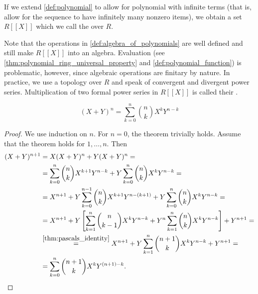 \begin{definition}\label{def:formal_power_series}
  If we extend \cref{def:polynomial} to allow for polynomial with infinite terms (that is, allow for the sequence to have infinitely many nonzero items), we obtain a set \( R[[X]] \) which we call the  over \( R \).

  Note that the operations in \cref{def:algebra_of_polynomials} are well defined and still make \( R[[X]] \) into an algebra. Evaluation (see \cref{thm:polynomial_ring_universal_property} and \cref{def:polynomial_function}) is problematic, however, since algebraic operations are finitary by nature. In practice, we use a topology over \( R \) and speak of convergent and divergent power series. Multiplication of two formal power series in \( R[[X]] \) is called their .
\end{definition}

\begin{theorem}\label{thm:binomial_theorem}
  \begin{equation*}
    (X + Y)^n = \sum_{k=0}^n \binom n k X^k Y^{n-k}
  \end{equation*}
\end{theorem}
\begin{proof}
  We use induction on \( n \). For \( n = 0 \), the theorem trivially holds. Assume that the theorem holds for \( 1, \ldots, n \). Then
  \begin{align*}
    (X + Y)^{n+1}
    &=
    X (X + Y)^n + Y (X + Y)^n
    = \\ &=
    \sum_{k=0}^n \binom n k X^{k+1} Y^{n-k} + Y \sum_{k=0}^n \binom n k X^k Y^{n-k}
    = \\ &=
    X^{n+1} + Y \sum_{k=0}^{n-1} \binom n k X^{k+1} Y^{n-(k+1)} + Y \sum_{k=0}^n \binom n k X^k Y^{n-k}
    = \\ &=
    X^{n+1} + Y \left[ \sum_{k=1}^n \binom n {k-1} X^k Y^{n-k} + Y^n \sum_{k=1}^n \binom n k X^k Y^{n-k} \right] + Y^{n+1}
    = \\ &\overset {\ref{thm:pascals_identity}} =
    X^{n+1} + Y \sum_{k=1}^n \binom {n+1} k X^k Y^{n-k} + Y^{n+1}
    = \\ &=
    \sum_{k=0}^n \binom {n+1} k X^k Y^{(n+1)-k}.
  \end{align*}
\end{proof}

